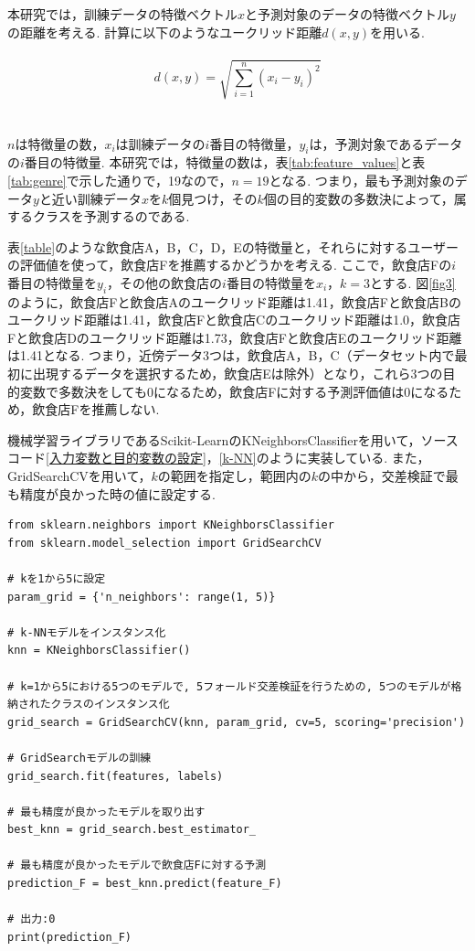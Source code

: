 \documentclass[12pt,a4j]{jreport}
\begin{document}
本研究では，訓練データの特徴ベクトル\( x \)と予測対象のデータの特徴ベクトル\( y \)の距離を考える.
計算に以下のようなユークリッド距離\( d(x, y) \)を用いる.\\\\
\[
d(x, y) = \sqrt{\sum_{i=1}^{n} (x_i - y_i)^2}
\]\\\\
\( n \)は特徴量の数，\( x_i \)は訓練データの\( i \)番目の特徴量，\( y_i \)は，予測対象であるデータの\( i \)番目の特徴量.
本研究では，特徴量の数は，表\ref{tab:feature_values}と表\ref{tab:genre}で示した通りで，19なので，\( n = 19 \)となる.
つまり，最も予測対象のデータ\( y \)と近い訓練データ\( x \)を\( k \)個見つけ，その\( k \)個の目的変数の多数決によって，属するクラスを予測するのである.

表\ref{table}のような飲食店A，B，C，D，Eの特徴量と，それらに対するユーザーの評価値を使って，飲食店Fを推薦するかどうかを考える.
ここで，飲食店Fの\( i \)番目の特徴量を\( y_i \)，その他の飲食店の\( i \)番目の特徴量を\( x_i \)，\( k = 3 \)とする.
図\ref{fig3}のように，飲食店Fと飲食店Aのユークリッド距離は1.41，飲食店Fと飲食店Bのユークリッド距離は1.41，飲食店Fと飲食店Cのユークリッド距離は1.0，飲食店Fと飲食店Dのユークリッド距離は1.73，飲食店Fと飲食店Eのユークリッド距離は1.41となる.
つまり，近傍データ3つは，飲食店A，B，C（データセット内で最初に出現するデータを選択するため，飲食店Eは除外）となり，これら3つの目的変数で多数決をしても0になるため，飲食店Fに対する予測評価値は0になるため，飲食店Fを推薦しない.

機械学習ライブラリであるScikit-LearnのKNeighborsClassifierを用いて，ソースコード\ref{入力変数と目的変数の設定}，\ref{k-NN}のように実装している.
また，GridSearchCVを用いて，\( k \)の範囲を指定し，範囲内の\( k \)の中から，交差検証で最も精度が良かった時の値に設定する.\\

\begin{lstlisting}[caption=k-NNによる予測,label=k-NN]
from sklearn.neighbors import KNeighborsClassifier
from sklearn.model_selection import GridSearchCV

# kを1から5に設定
param_grid = {'n_neighbors': range(1, 5)}

# k-NNモデルをインスタンス化
knn = KNeighborsClassifier()

# k=1から5における5つのモデルで, 5フォールド交差検証を行うための, 5つのモデルが格納されたクラスのインスタンス化
grid_search = GridSearchCV(knn, param_grid, cv=5, scoring='precision')

# GridSearchモデルの訓練
grid_search.fit(features, labels)

# 最も精度が良かったモデルを取り出す
best_knn = grid_search.best_estimator_

# 最も精度が良かったモデルで飲食店Fに対する予測
prediction_F = best_knn.predict(feature_F)

# 出力:0
print(prediction_F) 
\end{lstlisting}
\end{document}

